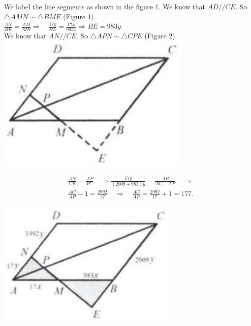 \documentclass{article}
\begin{document}
We label the line segments as shown in the figure 1. We know that \(A D / / C E\). So \(\triangle A M N \sim \triangle B M E\) (Figure 1).\\
\(\frac{A N}{B E}=\frac{A M}{M B} \Rightarrow \quad \frac{17 y}{B E}=\frac{17 x}{983 x} \Rightarrow B E=983 y\).\\
We know that \(A N / / C E\). So \(\triangle A P N \sim \triangle C P E\) (Figure 2).\\
\centering
\includegraphics[width=\textwidth]{images/142(2).jpg}

\[
\begin{aligned}
& \frac{A N}{C E}=\frac{A P}{P C} \quad \Rightarrow \frac{17 y}{(2009+983) y}=\frac{A P}{A C-A P} \quad \Rightarrow \\
& \frac{A C}{A P}-1=\frac{2992}{17} \quad \Rightarrow \quad \frac{A C}{A P}=\frac{2992}{17}+1=177 .
\end{aligned}
\]

\begin{center}
\includegraphics[width=\textwidth]{images/142(1).jpg}
\end{center}
\end{document}
